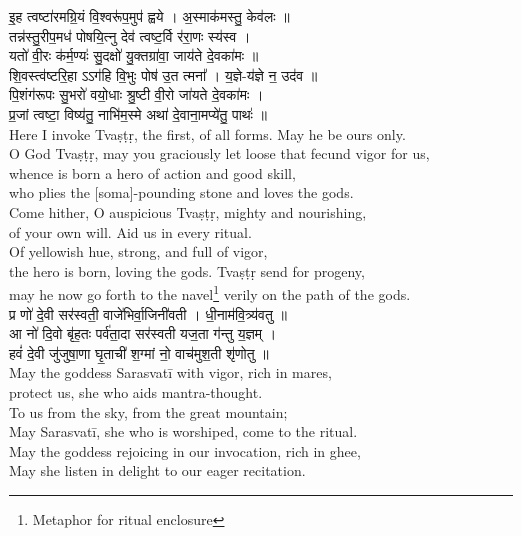 \documentclass[11pt]{article}
\begin{document}
\begin{adjustwidth}{6em}{.2em}
{\large\skts\color{deepblue}
इ॒ह त्वष्टा॑रमग्रि॒यं वि॒श्वरू॑प॒मुप॑ ह्वये । अ॒स्माक॑मस्तु॒ केव॑लः ॥\\ 
तन्न॑स्तु॒रीप॒मध॑ पोषयि॒त्नु देव॑ त्वष्ट॒र्वि र॑रा॒णः स्य॑स्व ।\\
यतो॑ वी॒रः क॑र्म॒ण्यः॑ सु॒दक्षो॑ यु॒क्तग्रा॑वा॒ जाय॑ते दे॒वका॑मः ॥\\
शि॒वस्त्व॑ष्टरि॒हा ऽऽग॑हि वि॒भुः पोष॑ उ॒त त्मना᳚ । य॒ज्ञे-य॑ज्ञे न॒ उद॑व ॥\\
पि॒शंग॑रूपः सु॒भरो॑ वयो॒धाः श्रु॒ष्टी वी॒रो जा॑यते दे॒वका॑मः ।\\
प्र॒जां त्वष्टा॒ विष्य॑तु॒ नाभि॑म॒स्मे अथा॑ दे॒वाना॒मप्ये॑तु॒ पाथः॑ ॥}\\[5pt]
Here I invoke Tvaṣṭṛ, the first, of all forms. May he be ours only.\\
O God Tvaṣṭṛ, may you graciously let loose that fecund vigor for us,\\
whence is born a hero of action and good skill,\\
who plies the [soma]-pounding stone and loves the gods.\\
Come hither, O auspicious Tvaṣṭṛ, mighty and nourishing,\\
of your own will. Aid us in every ritual.\\
Of yellowish hue, strong, and full of vigor,\\ 
the hero is born, loving the gods. Tvaṣṭṛ send for progeny,\\
may he now go forth to the navel\footnote{Metaphor for ritual enclosure} verily on the path of the gods.\\[10pt]

{\large\skts\color{deepblue}
प्र णो॑ दे॒वी सर॑स्वती॒ वाजे॑भिर्वा॒जिनी॑वती । धी॒नाम॑वि॒त्र्य॑वतु ॥\\
आ नो॑ दि॒वो बृ॑ह॒तः पर्व॑ता॒दा सर॑स्वती यज॒ता ग॑न्तु य॒ज्ञम् ।\\
हवं॑ दे॒वी जु॑जुषा॒णा घृ॒ताची॑ श॒ग्मां नो॒ वाच॑मुश॒ती श‍ृ॑णोतु ॥}\\[5pt]
May the goddess Sarasvatī with vigor, rich in mares,\\
protect us, she who aids mantra-thought.\\
To us from the sky, from the great mountain;\\
May Sarasvatī, she who is worshiped, come to the ritual.\\
May the goddess rejoicing in our invocation, rich in ghee,\\
May she listen in delight to our eager recitation.\\[10pt]


\end{adjustwidth}
\end{document}
